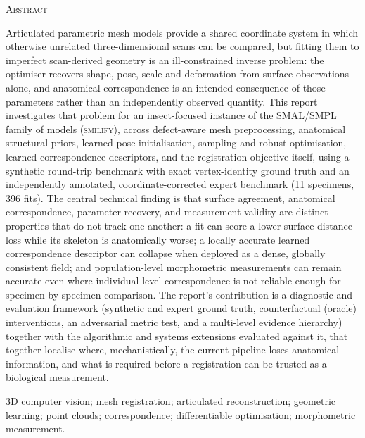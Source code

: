 \thispagestyle{empty}
\begin{center}
{\scshape\large Abstract}
\end{center}
\vspace{0.4\baselineskip}
\noindent
Articulated parametric mesh models provide a shared coordinate system in
which otherwise unrelated three-dimensional scans can be compared, but
fitting them to imperfect scan-derived geometry is an ill-constrained
inverse problem: the optimiser recovers shape, pose, scale and deformation
from surface observations alone, and anatomical correspondence is an
intended consequence of those parameters rather than an independently
observed quantity. This report investigates that problem for an
insect-focused instance of the SMAL/SMPL family of models (\textsc{smilify}),
across defect-aware mesh preprocessing, anatomical structural priors,
learned pose initialisation, sampling and robust optimisation, learned
correspondence descriptors, and the registration objective itself, using a
synthetic round-trip benchmark with exact vertex-identity ground truth and
an independently annotated, coordinate-corrected expert benchmark (11
specimens, 396 fits). The central technical finding is that surface
agreement, anatomical correspondence, parameter recovery, and measurement
validity are distinct properties that do not track one another: a fit can
score a lower surface-distance loss while its skeleton is anatomically
worse; a locally accurate learned correspondence descriptor can collapse
when deployed as a dense, globally consistent field; and population-level
morphometric measurements can remain accurate even where individual-level
correspondence is not reliable enough for specimen-by-specimen comparison.
The report's contribution is a diagnostic and evaluation framework
(synthetic and expert ground truth, counterfactual (oracle) interventions,
an adversarial metric test, and a multi-level evidence hierarchy) together
with the algorithmic and systems extensions evaluated against it, that
together localise where, mechanistically, the current pipeline loses
anatomical information, and what is required before a registration can be
trusted as a biological measurement.

\vspace{0.8\baselineskip}
 \footnotesize 3D computer vision;
mesh registration; articulated reconstruction; geometric learning; point
clouds; correspondence; differentiable optimisation; morphometric
measurement.

\clearpage
